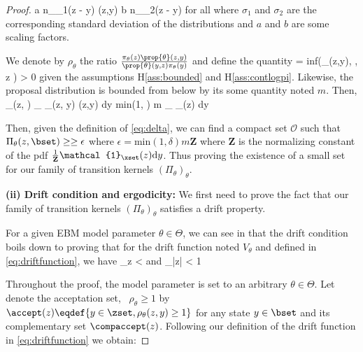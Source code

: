 \documentclass{article}
\begin{document}
\begin{proof}
\beq\label{eq:twogauss}
a n_{\sigma_1}(z - y) \leq \prop{\theta}(z,y)  \leq b n_{\sigma_2}(z - y) \quad \textrm{for all} \quad \theta \in \Theta
\eeq
where $\sigma_1$ and $\sigma_2$ are the corresponding standard deviation of the distributions and $a$ and $b$ are some scaling factors.

We denote by $\rho_\theta$ the ratio $\frac{\pi_\theta(z)  \prop{\theta}(z,y)}{\prop{\theta}(y,z) \pi_\theta(y)  }$ and define the quantity 
\beq\label{eq:delta}
\delta = \textrm{inf}(\rho_\theta(z,y), \theta \in \Theta, \quad z \in {} ) > 0
\eeq
 given the assumptions H\ref{ass:bounded} and H\ref{ass:contlogpi}.
Likewise, the proposal distribution is bounded from below by its some quantity noted $m$.
Then,
\beq 
\Pi_\theta(z, \bset) \geq  \int_{\bset \cap \xset} \alpha_\theta(z, y) \prop{\theta}(z,y) \textrm{d}y \geq \textrm{min}(1, \delta) m \int_{\bset} _\xset(z)  \textrm{d}y
\eeq

Then, given the definition of \eqref{eq:delta}, we can find a compact set $\mathcal{O}$ such that $\Pi_\theta(z, \bset) \geq \geq \epsilon$ where $\epsilon = \textrm{min}(1, \delta) m \textbf{Z}$ where $\textbf{Z}$ is the normalizing constant of the pdf $\frac{1}{\textbf{Z}}\mathcal{1}_\xset(z)  \textrm{d}y$.
Thus proving the existence of a small set for our family of transition kernels $(\Pi_\theta)_\theta$.

\medskip
\noindent \textbf{(ii) Drift condition and ergodicity: }
We first need to prove the fact that our family of transition kernels $(\Pi_\theta)_\theta$ satisfies a drift property.

For a given EBM model parameter $\theta \in \Theta$, we can see in \citep{jarner2000geometric} that the drift condition boils down to proving that for the drift function noted $V_\theta$ and defined in \eqref{eq:driftfunction}, we have
\beq
\sup \limits_{z \in \zset}   < \infty \quad \textrm{and} \quad \lim \sup \limits_{|z| \to \infty}   < 1
\eeq

Throughout the proof, the model parameter is set to an arbitrary $\theta \in \Theta$.
Let denote the acceptation set, \ie\ $\rho_\theta \geq 1$ by $\accept(z) \eqdef \{ y \in \zset, \rho_\theta(z,y) \geq 1 \}$ for any state $y \in \bset$ and its complementary set $\compaccept(z)$.
Following our definition of the drift function in \eqref{eq:driftfunction} we obtain:


\end{proof}
\end{document}
